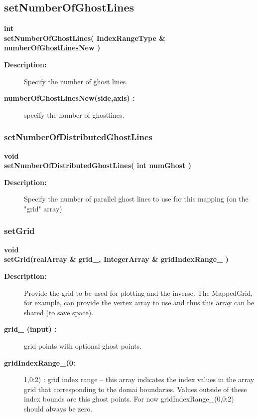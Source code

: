 \subsection{setNumberOfGhostLines}
 
\begin{flushleft} \textbf{%
int  \\ 
\settowidth{\MappingIncludeArgIndent}{setNumberOfGhostLines(}%
setNumberOfGhostLines( IndexRangeType \& numberOfGhostLinesNew )
}\end{flushleft}
\begin{description}
\item[{\bf Description:}] 
    Specify the number of ghost lines.
\item[{\bf numberOfGhostLinesNew(side,axis) :}]  specify the number of ghostlines.
\end{description}
\subsubsection{setNumberOfDistributedGhostLines}
 
\begin{flushleft} \textbf{%
void  \\ 
\settowidth{\MappingIncludeArgIndent}{setNumberOfDistributedGhostLines(}%
setNumberOfDistributedGhostLines( int numGhost )
}\end{flushleft}
\begin{description}
\item[{\bf Description:}] 
 Specify the number of parallel ghost lines to use for this mapping (on the "grid" array)
\end{description}
\subsubsection{setGrid}
 
\begin{flushleft} \textbf{%
void  \\ 
\settowidth{\MappingIncludeArgIndent}{setGrid(}%
setGrid(realArray \& grid\_, IntegerArray \& gridIndexRange\_ )
}\end{flushleft}
\begin{description}
\item[{\bf Description:}] 
    Provide the grid to be used for plotting and the inverse. The MappedGrid, for example,
  can provide the vertex array to use and thus this array can be shared (to save space). 
 
\item[{\bf grid\_ (input) :}]  grid points with optional ghost points.
\item[{\bf gridIndexRange\_(0:}] 1,0:2) : grid index range -- this array indicates the index values
   in the array grid that corresponding to the domai boundaries. Values outside of these
 index bounds are this ghost points. For now gridIndexRange\_(0,0:2) should always be zero.
 
\end{description}
